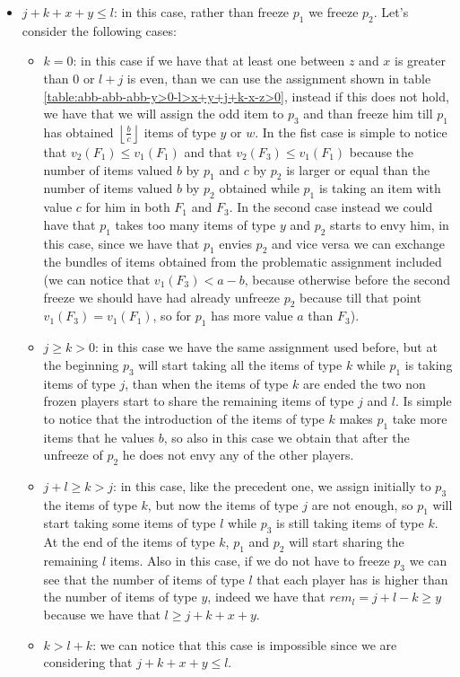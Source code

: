 \documentclass{article}
\newcommand{\floor}[3][2]{\left \lfloor\frac{#2}{#3}\right \rfloor}
\begin{document}
\begin{itemize}
    \item $j + k + x + y \le l$: in this case, rather than freeze $p_1$ we freeze $p_2$. Let's consider the following cases:\begin{itemize}
        \item $k = 0$: in this case if we have that at least one between $z$ and $x$ is greater than $0$ or $l+j$ is even, than we can use the assignment shown in table \ref{table:abb-abb-abb-y>0-l>x+y+j+k-x-z>0}, instead if this does not hold, we have that we will assign the odd item to $p_3$ and than freeze him till $p_1$ has obtained $\floor{b}{c}$ items of type $y$ or $w$. In the fist case is simple to notice that $v_2(F_1) \le v_1(F_1)$ and that $v_2(F_3) \le v_1(F_1)$ because the number of items valued $b$ by $p_1$ and $c$ by $p_2$ is larger or equal than the number of items valued  $b$ by $p_2$ obtained while $p_1$ is taking an item with value $c$ for him in both $F_1$ and $F_3$. In the second case instead we could have that $p_1$ takes too many items of type $y$ and $p_2$ starts to envy him, in this case, since we have that $p_1$ envies $p_2$ and vice versa we can exchange the bundles of items obtained from the problematic assignment included (we can notice that $v_1(F_3) < a-b$, because otherwise before the second freeze we should have had already unfreeze $p_2$ because  till that point $v_1(F_3) = v_1(F_1)$, so for $p_1$ has more value $a$ than $F_3$). 
        \item $j \ge k > 0$: in this case we have the same assignment used before, but at the beginning $p_3$ will start taking all the items of type $k$ while $p_1$ is taking items of type $j$, than when the items of type $k$ are ended the two non frozen players start to share the remaining items of type $j$ and $l$. Is simple to notice that the introduction of the items of type $k$ makes $p_1$ take more items that he values $b$, so also in this case we obtain that after the unfreeze of $p_2$ he does not envy any of the other players.
        \item $j+l \ge k >j$: in this case, like the precedent one, we assign initially to $p_3$ the items of type $k$, but now the items of type $j$ are not enough, so $p_1$ will start taking some items of type $l$ while $p_3$ is still taking items of type $k$. At the end of the items of type $k$, $p_1$ and $p_2$ will start sharing the remaining $l$ items. Also in this case, if we do not have to freeze $p_3$ we can see that the number of items of type $l$ that each player has is higher than the number of items of type $y$, indeed we have that $rem_l = j + l - k \ge y$ because we have that $l \ge j+k+x+y$.
        \item $k > l + k $: we can notice that this case is impossible since we are considering that  $j + k + x + y \le l$.
    \end{itemize}
\end{itemize}
\end{document}
